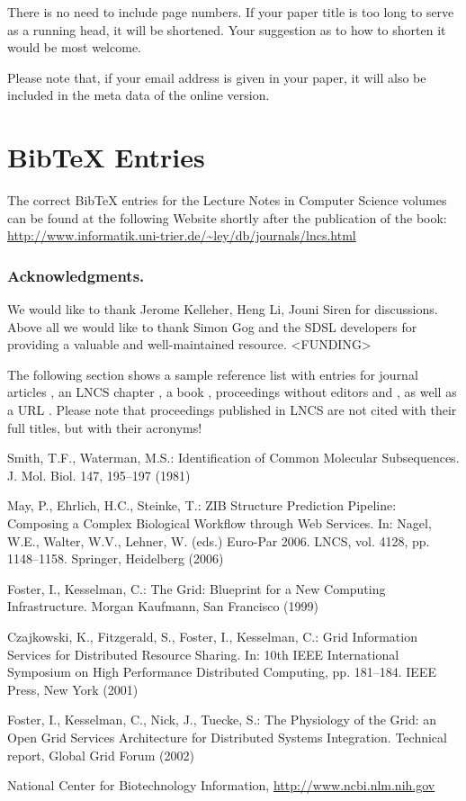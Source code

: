 \documentclass[runningheads,a4paper]{llncs}
\begin{document}
There is no need to include page numbers. If your paper title is too
long to serve as a running head, it will be shortened. Your suggestion
as to how to shorten it would be most welcome.


Please note that, if your email address is given in your paper,
it will also be included in the meta data of the online version.

\section{BibTeX Entries}

The correct BibTeX entries for the Lecture Notes in Computer Science
volumes can be found at the following Website shortly after the
publication of the book:
\url{http://www.informatik.uni-trier.de/~ley/db/journals/lncs.html}

\subsubsection*{Acknowledgments.} We would like to thank Jerome Kelleher, Heng Li, Jouni Siren for discussions. Above all we would like to thank Simon Gog and the SDSL developers for providing a valuable and well-maintained resource. <FUNDING>



The following section shows a sample reference list with entries for
journal articles \cite{jour}, an LNCS chapter \cite{lncschap}, a book
\cite{book}, proceedings without editors \cite{proceeding1} and
\cite{proceeding2}, as well as a URL \cite{url}.
Please note that proceedings published in LNCS are not cited with their
full titles, but with their acronyms!

\begin{thebibliography}{4}

 Smith, T.F., Waterman, M.S.: Identification of Common Molecular
Subsequences. J. Mol. Biol. 147, 195--197 (1981)

 May, P., Ehrlich, H.C., Steinke, T.: ZIB Structure Prediction Pipeline:
Composing a Complex Biological Workflow through Web Services. In: Nagel,
W.E., Walter, W.V., Lehner, W. (eds.) Euro-Par 2006. LNCS, vol. 4128,
pp. 1148--1158. Springer, Heidelberg (2006)

 Foster, I., Kesselman, C.: The Grid: Blueprint for a New Computing
Infrastructure. Morgan Kaufmann, San Francisco (1999)

 Czajkowski, K., Fitzgerald, S., Foster, I., Kesselman, C.: Grid
Information Services for Distributed Resource Sharing. In: 10th IEEE
International Symposium on High Performance Distributed Computing, pp.
181--184. IEEE Press, New York (2001)

 Foster, I., Kesselman, C., Nick, J., Tuecke, S.: The Physiology of the
Grid: an Open Grid Services Architecture for Distributed Systems
Integration. Technical report, Global Grid Forum (2002)

 National Center for Biotechnology Information, \url{http://www.ncbi.nlm.nih.gov}

\end{thebibliography}
\end{document}
